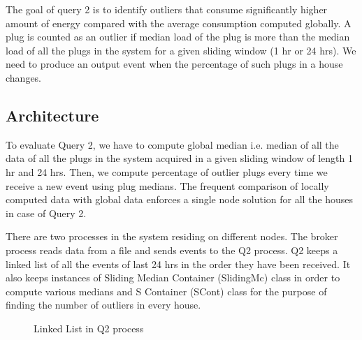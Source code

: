 The goal of query 2 is to identify outliers that consume significantly higher amount of energy compared with the average consumption computed globally.
A plug is counted as an outlier if median load of the plug is more than the median load of all the plugs in the system for a given sliding window (1 hr or 24 hrs).
We need to produce an output event when the percentage of such plugs in a house changes.

\subsection{Architecture}
To evaluate Query 2, we have to compute global median i.e. median of all the data of all the plugs in the system acquired in a given sliding window of length 1 hr and 24 hrs. Then, we compute percentage of outlier plugs every time we receive a new event using plug medians. The frequent comparison of locally computed data with global data enforces a single node solution for all the houses in case of Query 2.

There are two processes in the system residing on different nodes. The broker process reads data from a file and sends events to the Q2 process. Q2 keeps a linked list of all the events of last 24 hrs in the order they have been received. It also keeps instances of Sliding Median Container (SlidingMc) class in order to compute various medians and S Container (SCont) class for the purpose of finding the number of outliers in every house.

\begin{figure}[h]
\begin{center}
\vspace*{-0.4cm}
\caption{Linked List in Q2 process \label{fig:linked_list}}
\end{center}
\end{figure}
\vspace*{-0.3cm}

